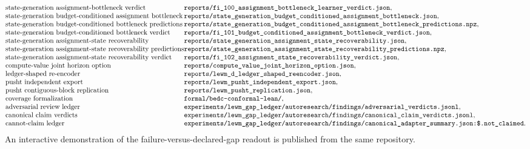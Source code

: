 $$\begin{array}{@{}l@{}l@{}}
\text{state-generation assignment-bottleneck verdict} & \texttt{reports/fi\_100\_assignment\_bottleneck\_learner\_verdict.json},\\
\text{state-generation budget-conditioned assignment bottleneck} & \texttt{reports/state\_generation\_budget\_conditioned\_assignment\_bottleneck.json},\\
\text{state-generation budget-conditioned bottleneck predictions} & \texttt{reports/state\_generation\_budget\_conditioned\_assignment\_bottleneck\_predictions.npz},\\
\text{state-generation budget-conditioned bottleneck verdict} & \texttt{reports/fi\_101\_budget\_conditioned\_assignment\_bottleneck\_verdict.json},\\
\text{state-generation assignment-state recoverability} & \texttt{reports/state\_generation\_assignment\_state\_recoverability.json},\\
\text{state-generation assignment-state recoverability predictions} & \texttt{reports/state\_generation\_assignment\_state\_recoverability\_predictions.npz},\\
\text{state-generation assignment-state recoverability verdict} & \texttt{reports/fi\_102\_assignment\_state\_recoverability\_verdict.json},\\
\text{compute-value joint horizon option} & \texttt{reports/compute\_value\_joint\_horizon\_option.json},\\
\text{ledger-shaped re-encoder} & \texttt{reports/lewm\_d\_ledger\_shaped\_reencoder.json},\\
\text{pusht independent export} & \texttt{reports/lewm\_pusht\_independent\_export.json},\\
\text{pusht contiguous-block replication} & \texttt{reports/lewm\_pusht\_replication.json},\\
\text{coverage formalization} & \texttt{formal/bedc-conformal-lean/},\\
\text{adversarial review ledger} &
\texttt{experiments/lewm\_gap\_ledger/autoresearch/findings/adversarial\_verdicts.jsonl},\\
\text{canonical claim verdicts} &
\texttt{experiments/lewm\_gap\_ledger/autoresearch/findings/canonical\_claim\_verdicts.jsonl},\\
\text{cannot-claim ledger} &
\texttt{experiments/lewm\_gap\_ledger/autoresearch/findings/canonical\_adapter\_summary.json:\$.not\_claimed}.
\end{array}
$$
An interactive demonstration of the failure-versus-declared-gap readout is
published from the same repository.

